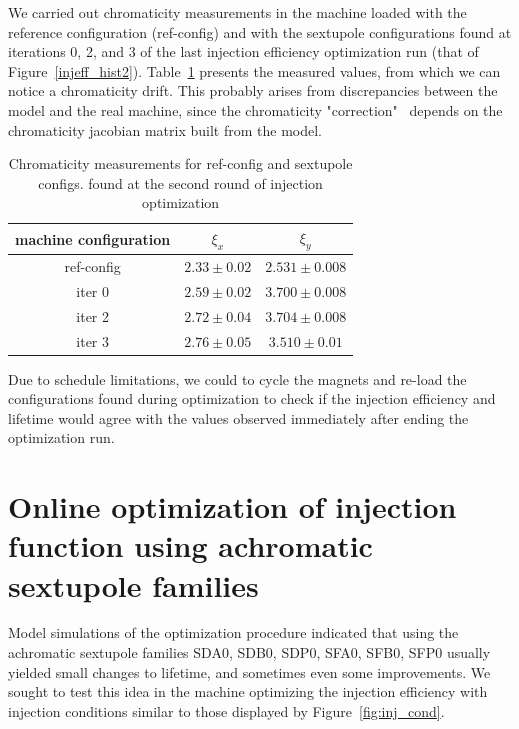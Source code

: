 \documentclass[a4paper,11pt]{article}
\begin{document}
We carried out chromaticity measurements in the machine loaded with the reference configuration (ref-config) and with the sextupole configurations found at iterations 0, 2, and 3 of the last injection efficiency optimization run
(that of Figure~\ref{injeff_hist2}). Table~\ref{chrom} presents the measured values, from which we can notice a chromaticity drift. This probably arises from discrepancies between the model and the real machine, since the chromaticity "correction"~ depends on the chromaticity jacobian matrix built from the model.
\begin{table}[h]
\centering
\begin{tabular}{@{}ccc@{}}
\toprule
machine configuration & $\xi_x$       & $\xi_y$         \\ \midrule
ref-config   & $2.33\pm0.02$ & $2.531\pm0.008$ \\
iter 0   & $2.59\pm0.02$ & $3.700\pm0.008$   \\
iter 2   & $2.72\pm0.04$ & $3.704\pm0.008$ \\
iter 3   & $2.76\pm0.05$  & $3.510\pm0.01$   \\ \bottomrule
\end{tabular}
\caption{Chromaticity measurements for ref-config and sextupole configs. found at the second round of injection optimization}
\label{chrom}
\end{table}
Due to schedule limitations, we could to cycle the magnets and re-load the configurations found during optimization to check if the injection efficiency and lifetime would agree with the values observed immediately after ending the optimization run.



\section{Online optimization of injection function using achromatic sextupole families}
Model simulations of the optimization procedure indicated that using the achromatic sextupole families SDA0, SDB0, SDP0, SFA0, SFB0, SFP0 usually yielded small changes to lifetime, and sometimes even some improvements. We sought to test this idea in the machine optimizing the injection efficiency with injection conditions similar to those displayed by Figure~\ref{fig:inj_cond}.
\end{document}
